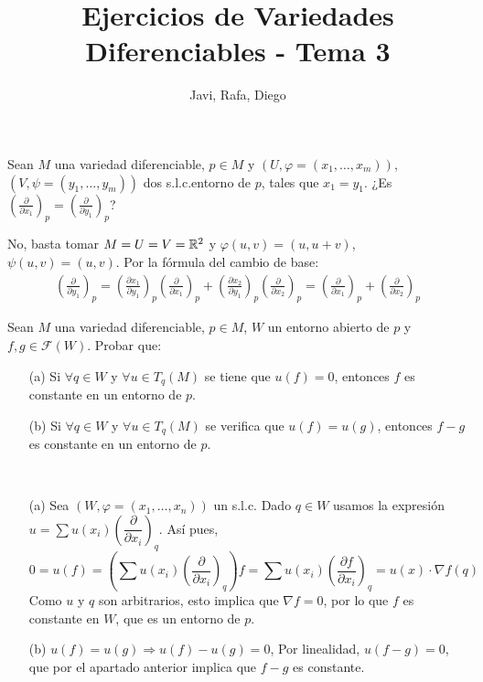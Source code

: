 \documentclass[twoside]{article}
\begin{document}
\title{Ejercicios de Variedades Diferenciables - Tema 3}
\author{Javi, Rafa, Diego}
\maketitle



\begin{ejercicio}{1}\label{1}
Sean $M$ una variedad diferenciable, $p \in M$ y $(U, \varphi = (x_1, \dots , x_m))$, $(V, \psi =
(y_1, \dots , y_m))$ dos s.l.c.entorno de $p$, tales que $x_1 = y_1$. ¿Es $\left(
\frac{\partial}{\partial x_1}\right)_p = \left(\frac{\partial}{\partial y_1}\right)_p$?
\end{ejercicio}
\begin{solucion}
No, basta tomar $M=U=V=\mathbb{R}^2$ y $φ(u,v)=(u,u+v)$, $ψ(u,v)=(u,v)$.
Por la fórmula del cambio de base:
\begin{gather*} \left(\frac{\partial}{\partial y_1}\right)_p = \left(\frac{\partial x_1}{\partial y_1}\right)_p \left(\frac{\partial}{\partial x_1}\right)_p +  \left(\frac{\partial x_2}{\partial y_1}\right)_p  \left(\frac{\partial}{\partial x_2}\right)_p =
 \left(\frac{\partial}{\partial x_1}\right)_p + \left(\frac{\partial}{\partial x_2}\right)_p
\end{gather*}
\end{solucion}
\newpage

\begin{ejercicio}{2}
Sean $M$ una variedad diferenciable, $p \in M$, $W$ un entorno abierto de $p$ y
$f,g \in \mathcal{F}(W)$. Probar que:

\begin{itemize}
\item[(a)] Si $\forall q \in W$ y $\forall u \in  T_q(M)$ se tiene que $u(f) = 0$, entonces $f$ es constante
en un entorno de $p$.
\item[(b)] Si $\forall q \in W$ y $\forall u \in T_q(M)$ se verifica que $u(f) = u(g)$, entonces $f - g$ es
constante en un entorno de $p$.
\end{itemize}
\end{ejercicio}
\begin{solucion}\
\begin{itemize}
\item[(a)] Sea $(W,\varphi=(x_1,\dots,x_n))$ un s.l.c. Dado $q\in W$ usamos la expresión $u = \sum u(x_i) \left(\dfrac{\partial}{\partial x_i}\right)_q$. Así pues, 
\[
0=u(f) = \left(\sum u(x_i) \left(\dfrac{\partial}{\partial x_i}\right)_q\right)f=\sum u(x_i) \left(\frac{\partial f}{\partial x_i}\right)_q = u(x)\cdot\nabla f(q)
\]
Como $u$ y $q$ son arbitrarios, esto implica que $\nabla f=0$, por lo que $f$ es constante en $W$, que es un entorno de $p$. 
\item[(b)] $u(f) = u(g)\Rightarrow u(f)-u(g)=0$, Por linealidad, $u(f-g)=0$, que por el apartado anterior implica que $f-g$ es constante.
\end{itemize}
\end{solucion}
\end{document}
